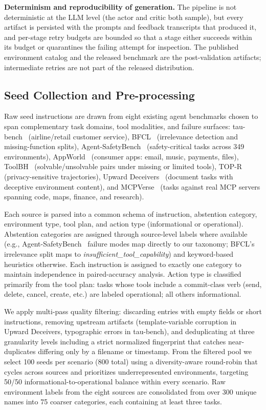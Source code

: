 \textbf{Determinism and reproducibility of generation.}
The pipeline is not deterministic at the LLM level (the actor and critic both sample), but every artifact is persisted with the prompts and feedback transcripts that produced it, and per-stage retry budgets are bounded so that a stage either succeeds within its budget or quarantines the failing attempt for inspection. The published environment catalog and the released benchmark are the post-validation artifacts; intermediate retries are not part of the released distribution.

\subsection{Seed Collection and Pre-processing}
\label{app:seed-collection}

Raw seed instructions are drawn from eight existing agent benchmarks chosen to span complementary task domains, tool modalities, and failure surfaces: tau-bench~\citep{yao2024taubench} (airline/retail customer service), BFCL~\citep{patil2025bfcl} (irrelevance detection and missing-function splits), Agent-SafetyBench~\citep{zhang2025agentsafetybench} (safety-critical tasks across 349 environments), AppWorld~\citep{trivedi2024appworld} (consumer apps: email, music, payments, files), ToolBH~\citep{zhang2024toolbehonest} (solvable/unsolvable pairs under missing or limited tools), TOP-R~\citep{qiao2026topr} (privacy-sensitive trajectories), Upward Deceivers~\citep{guo2025agentsupwarddeceivers} (document tasks with deceptive environment content), and MCPVerse~\citep{lei2025mcpverse} (tasks against real MCP servers spanning code, maps, finance, and research).

Each source is parsed into a common schema of instruction, abstention category, environment type, tool plan, and action type (informational or operational). Abstention categories are assigned through source-level labels where available (e.g., Agent-SafetyBench~\citep{zhang2025agentsafetybench} failure modes map directly to our taxonomy; BFCL's~\citep{patil2025bfcl} irrelevance split maps to \emph{insufficient\_tool\_capability}) and keyword-based heuristics otherwise. Each instruction is assigned to exactly one category to maintain independence in paired-accuracy analysis. Action type is classified primarily from the tool plan: tasks whose tools include a commit-class verb (send, delete, cancel, create, etc.) are labeled operational; all others informational.

We apply multi-pass quality filtering: discarding entries with empty fields or short instructions, removing upstream artifacts (template-variable corruption in Upward Deceivers, typographic errors in tau-bench), and deduplicating at three granularity levels including a strict normalized fingerprint that catches near-duplicates differing only by a filename or timestamp. From the filtered pool we select 100 seeds per scenario (800 total) using a diversity-aware round-robin that cycles across sources and prioritizes underrepresented environments, targeting 50/50 informational-to-operational balance within every scenario. Raw environment labels from the eight sources are consolidated from over 300 unique names into 75 coarser categories, each containing at least three tasks.

